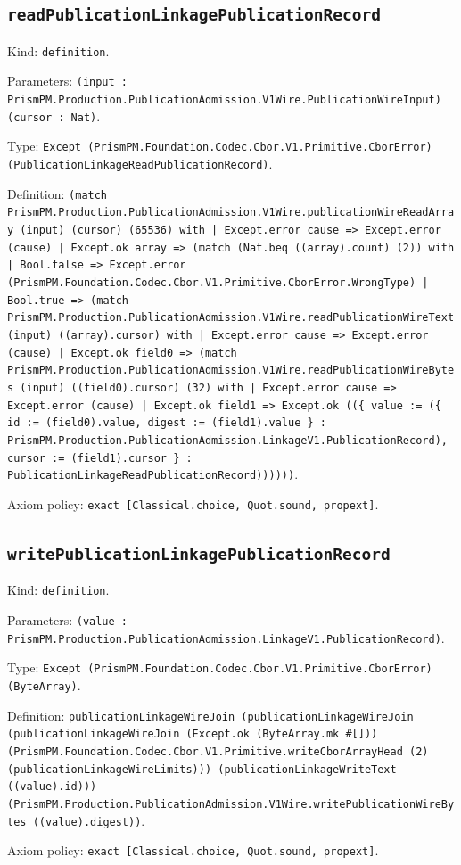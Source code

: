 \documentclass[11pt]{article}
\begin{document}
\subsection*{\texttt{readPublicationLinkagePublicationRecord}}
\noindent Kind: \texttt{definition}.\par
\noindent Parameters: \texttt{(input : PrismPM.Production.PublicationAdmission.V1Wire.PublicationWireInput) (cursor : Nat)}.\par
\noindent Type: \texttt{Except (PrismPM.Foundation.Codec.Cbor.V1.Primitive.CborError) (PublicationLinkageReadPublicationRecord)}.\par
\noindent Definition: \texttt{(match PrismPM.Production.PublicationAdmission.V1Wire.publicationWireReadArray (input) (cursor) (65536) with | Except.error cause => Except.error (cause) | Except.ok array => (match (Nat.beq ((array).count) (2)) with | Bool.false => Except.error (PrismPM.Foundation.Codec.Cbor.V1.Primitive.CborError.WrongType) | Bool.true => (match PrismPM.Production.PublicationAdmission.V1Wire.readPublicationWireText (input) ((array).cursor) with | Except.error cause => Except.error (cause) | Except.ok field0 => (match PrismPM.Production.PublicationAdmission.V1Wire.readPublicationWireBytes (input) ((field0).cursor) (32) with | Except.error cause => Except.error (cause) | Except.ok field1 => Except.ok ((\{ value := (\{ id := (field0).value, digest := (field1).value \} : PrismPM.Production.PublicationAdmission.LinkageV1.PublicationRecord), cursor := (field1).cursor \} : PublicationLinkageReadPublicationRecord))))))}.\par
\noindent Axiom policy: \texttt{exact [Classical.choice, Quot.sound, propext]}.\par
\subsection*{\texttt{writePublicationLinkagePublicationRecord}}
\noindent Kind: \texttt{definition}.\par
\noindent Parameters: \texttt{(value : PrismPM.Production.PublicationAdmission.LinkageV1.PublicationRecord)}.\par
\noindent Type: \texttt{Except (PrismPM.Foundation.Codec.Cbor.V1.Primitive.CborError) (ByteArray)}.\par
\noindent Definition: \texttt{publicationLinkageWireJoin (publicationLinkageWireJoin (publicationLinkageWireJoin (Except.ok (ByteArray.mk \#[])) (PrismPM.Foundation.Codec.Cbor.V1.Primitive.writeCborArrayHead (2) (publicationLinkageWireLimits))) (publicationLinkageWriteText ((value).id))) (PrismPM.Production.PublicationAdmission.V1Wire.writePublicationWireBytes ((value).digest))}.\par
\noindent Axiom policy: \texttt{exact [Classical.choice, Quot.sound, propext]}.\par
\end{document}
